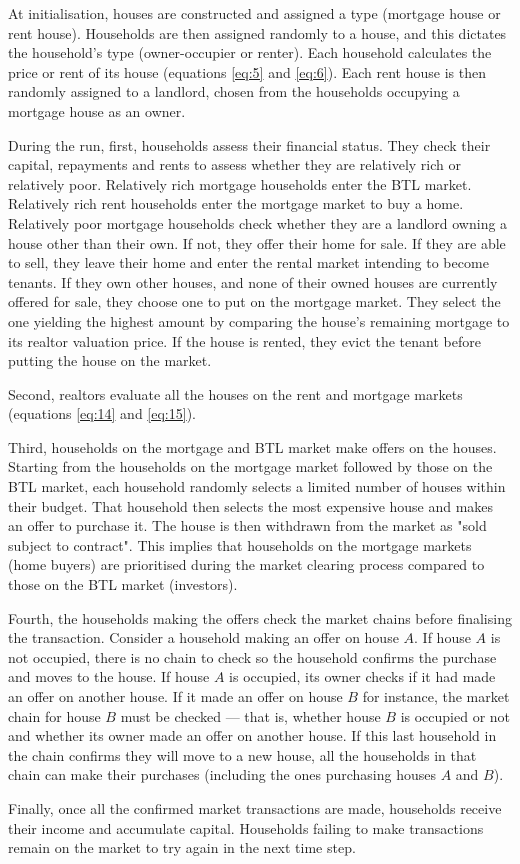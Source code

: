 At initialisation, houses are constructed and assigned a type (mortgage house or rent house). Households are then assigned randomly to a house, and this dictates the household's type (owner-occupier or renter). Each household calculates the price or rent of its house (equations \ref{eq:5} and \ref{eq:6}). Each rent house is then randomly assigned to a landlord, chosen from the households occupying a mortgage house as an owner.

During the run, first, households assess their financial status. They check their capital, repayments and rents to assess whether they are relatively rich or relatively poor. Relatively rich mortgage households enter the BTL market. Relatively rich rent households enter the mortgage market to buy a home. Relatively poor mortgage households check whether they are a landlord owning a house other than their own. If not, they offer their home for sale. If they are able to sell, they leave their home and enter the rental market intending to become tenants. If they own other houses, and none of their owned houses are currently offered for sale, they choose one to put on the mortgage market. They select the one yielding the highest amount by comparing the house's remaining mortgage to its realtor valuation price. If the house is rented, they evict the tenant before putting the house on the market.

Second, realtors evaluate all the houses on the rent and mortgage markets (equations \ref{eq:14} and \ref{eq:15}). 

Third, households on the mortgage and BTL market make offers on the houses. Starting from the households on the mortgage market followed by those on the BTL market, each household randomly selects a limited number of houses within their budget. That household then selects the most expensive house and makes an offer to purchase it. The house is then withdrawn from the market as "sold subject to contract". This implies that households on the mortgage markets (home buyers) are prioritised during the market clearing process compared to those on the BTL market (investors).

Fourth, the households making the offers check the market chains before finalising the transaction. Consider a household making an offer on house \(A\). If house \(A\) is not occupied, there is no chain to check so the household confirms the purchase and moves to the house. If house \(A\) is occupied, its owner checks if it had made an offer on another house. If it made an offer on house \(B\) for instance, the market chain for house \(B\) must be checked --- that is, whether house \(B\) is occupied or not and whether its owner made an offer on another house. If this last household in the chain confirms they will move to a new house, all the households in that chain can make their purchases (including the ones purchasing houses \(A\) and \(B\)). 

Finally, once all the confirmed market transactions are made, households receive their income and accumulate capital. Households failing to make transactions remain on the market to try again in the next time step.